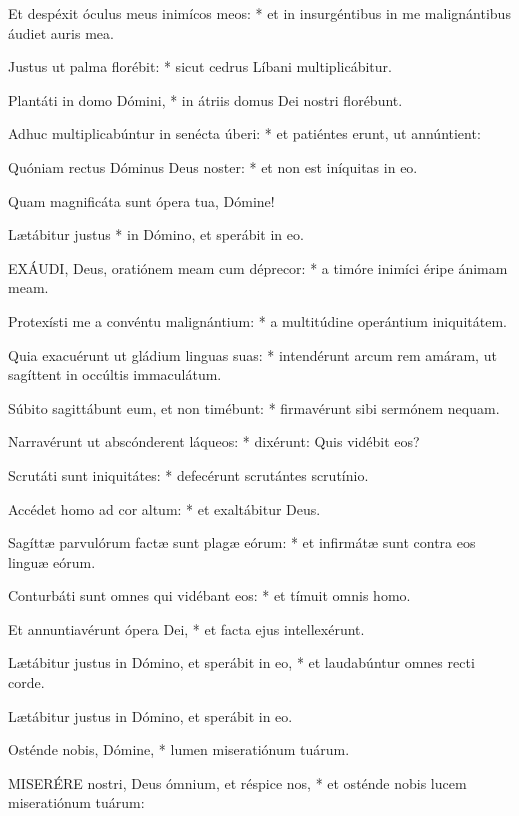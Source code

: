 Et despéxit óculus meus inimícos meos: * et in insurgéntibus in me malignántibus áudiet auris mea.

Justus ut palma florébit: * sicut cedrus Líbani multiplicábitur.

Plantáti in domo Dómini, * in átriis domus Dei nostri florébunt.

Adhuc multiplicabúntur in senécta úberi: * et patiéntes erunt, ut annúntient:

Quóniam rectus Dóminus Deus noster: * et non est iníquitas in eo.

 Quam magnificáta sunt ópera tua, Dómine!

 Lætábitur justus * in Dómino, et sperábit in eo.


\lettrine[lines=2]{E}{XÁUDI}, Deus, oratiónem meam cum déprecor: * a timóre inimíci éripe ánimam meam.

Protexísti me a convéntu malignántium: * a multitúdine operántium iniquitátem.

Quia exacuérunt ut gládium linguas suas: * intendérunt arcum rem amáram, ut sagíttent in occúltis immaculátum.

Súbito sagittábunt eum, et non timébunt: * firmavérunt sibi sermónem nequam.

Narravérunt ut abscónderent láqueos: * dixérunt: Quis vidébit eos?

Scrutáti sunt iniquitátes: * defecérunt scrutántes scrutínio.

Accédet homo ad cor altum: * et exaltábitur Deus.

Sagíttæ parvulórum factæ sunt plagæ eórum: * et infirmátæ sunt contra eos linguæ eórum.

Conturbáti sunt omnes qui vidébant eos: * et tímuit omnis homo.

Et annuntiavérunt ópera Dei, * et facta ejus intellexérunt.

Lætábitur justus in Dómino, et sperábit in eo, * et laudabúntur omnes recti corde.

 Lætábitur justus in Dómino, et sperábit in eo.

 Osténde nobis, Dómine, * lumen miseratiónum tuárum.


\lettrine[lines=2]{M}{ISERÉRE} nostri, Deus ómnium, et réspice nos, * et osténde nobis lucem miseratiónum tuárum:

